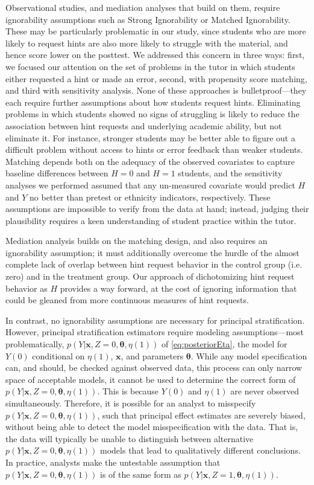 \documentclass{article}\usepackage[]{graphicx}\usepackage[]{color}
\begin{document}
Observational studies, and mediation analyses that build on them,
require ignorability assumptions such as Strong Ignorability or
Matched Ignorability.
These may be particularly problematic in our study, since students who
are more likely to request hints are also more likely to struggle with
the material, and hence score lower on the posttest.
We addressed this concern in three ways: first, we focused our attention
on the set of problems in the tutor in which students either requested
a hint or made an error, second, with propensity score matching, and
third with sensitivity analysis.
None of these approaches is bulletproof---they each require further
assumptions about how students request hints.
Eliminating problems in which students showed no signs of struggling
is likely to reduce the association between hint requests and
underlying academic ability, but not eliminate it.
For instance, stronger students may be better able to figure out a
difficult problem without access to hints or error feedback than
weaker students.
Matching depends both on the adequacy of the observed covariates to
capture baseline differences between $H=0$ and $H=1$ students, and the
sensitivity analyses we performed assumed that any un-measured
covariate would predict $H$ and $Y$ no better than pretest or ethnicity indicators, respectively.
These assumptions are impossible to verify from the data at hand;
instead, judging their plausibility requires a keen understanding of student practice within
the tutor.

Mediation analysis builds on the matching design, and also requires an
ignorability assumption; it must
additionally overcome the hurdle of the almost complete lack of
overlap between hint request behavior in the control group (i.e. zero)
and in the treatment group.
Our approach of dichotomizing hint request behavior as $H$ provides a
way forward, at the cost of ignoring information that could be gleaned
from more continuous measures of hint requests.

In contrast, no ignorability assumptions are necessary for principal
stratification.
However, principal stratification estimators require modeling
assumptions---most problematically, $p(Y|\bm{x},Z=0,\bm{\theta},\eta(1))$ of
\eqref{eq:posteriorEta}, the model for $Y(0)$
conditional on $\eta(1)$, $\bm{x}$, and parameters $\bm{\theta}$.
While any model specification can, and should, be checked against
observed data, this process can only narrow space of acceptable
models, it cannot be used to determine the correct form of
$p(Y|\bm{x},Z=0,\bm{\theta},\eta(1))$.
This is because $Y(0)$ and $\eta(1)$ are never observed simultaneously.
Therefore, it is possible for an analyst to misspecify $p(Y|\bm{x},Z=0,\bm{\theta},\eta(1))$, such that principal effect estimates are
severely biased, without being able to detect the model
misspecification with the data.
That is, the data will typically be unable to distinguish between
alternative $p(Y|\bm{x},Z=0,\bm{\theta},\eta(1))$ models that lead to
qualitatively different conclusions.
In practice, analysts make the untestable assumption that $p(Y|\bm{x},Z=0,\bm{\theta},\eta(1))$ is
of the same form as $p(Y|\bm{x},Z=1,\bm{\theta},\eta(1))$.
\end{document}
